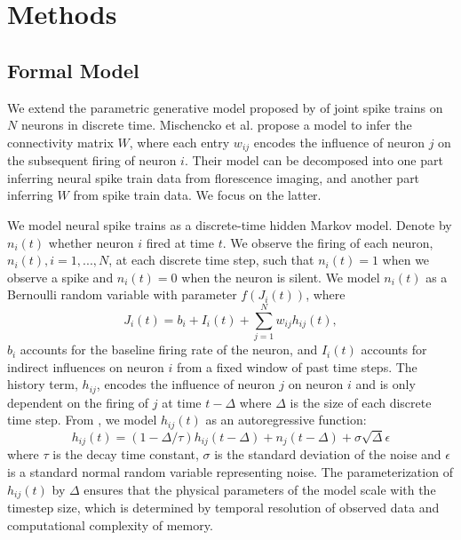 \documentclass{article}
\begin{document}
\section{Methods}

\subsection{Formal Model}
We extend the parametric generative model proposed by
\citep{mishchencko2011} of joint spike trains on $N$ neurons in
discrete time. Mischencko et al. propose a model to infer the
connectivity matrix $W$, where each entry $w_{ij}$ encodes the
influence of neuron $j$ on the subsequent firing of neuron $i$. Their
model can be decomposed into one part inferring neural spike train
data from florescence imaging, and another part inferring $W$ from
spike train data. We focus on the latter.

We model neural spike trains as a discrete-time hidden Markov model.
Denote by $ n_i(t) $ whether neuron $i$ fired at time $t$. We observe
the firing of each neuron, $n_i(t), i = 1,...,N$, at each discrete
time step, such that $n_i(t) = 1$ when we observe a spike and $n_i(t)
= 0$ when the neuron is silent. We model $n_i(t)$ as a Bernoulli
random variable with parameter $f(J_i(t))$, where
\begin{equation}
\label{J} J_i(t) = b_i + I_i(t) + \sum_{j=1}^{N} w_{ij}h_{ij}(t),
\end{equation}
$b_i$ accounts for the baseline firing rate of the neuron, and $I_i(t)$ accounts for indirect
influences on neuron $i$ from a fixed window of past time steps.
The history term, $h_{ij}$, encodes the influence of neuron $j$ on
neuron $i$ and is only dependent on the firing of $j$ at time
$t-\Delta$ where $\Delta$ is the size of each discrete time step.
From \citep{mishchencko2011}, we model $h_{ij}(t)$ as an autoregressive
function:
\begin{equation}
\label{h} h_{ij}(t) = (1-\Delta/\tau)h_{ij}(t-\Delta)
  + n_j(t-\Delta)+\sigma\sqrt{\Delta}\epsilon
\end{equation}
where $ \tau$ is the decay time constant, $\sigma$
is the standard deviation of the noise and $\epsilon$ is a
standard normal random variable representing noise.  The parameterization
of $h_{ij}(t)$ by $\Delta$ ensures that the physical parameters of
the model scale with the timestep size, which is determined by
temporal resolution of observed data and computational complexity
of memory.

\end{document}
